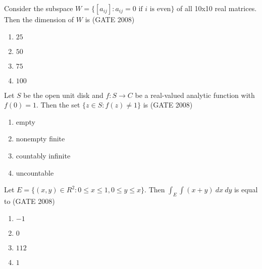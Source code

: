 \iffalse
\chapter{2008}
\author{AI24BTECH11030}
\section{ma}
\fi
    

\item {Consider the subspace $W=\{[a_{ij}]: a_{ij}=0 \text{ if } i \text{ is even}\}$ of all 10x10 real matrices. Then the dimension of $W$ is \hfill (GATE 2008)

\begin{multicols}{4}
    \begin{enumerate}
        \item $25$
        \item $50$
        \item $75$
        \item $100$
    \end{enumerate}
\end{multicols}}

\item { Let $S$ be the open unit disk and $f: S\rightarrow C$ be a real-valued analytic function with $f(0) = 1$. Then the set $\{z \in S: f(z) \ne 1\}$ is \hfill (GATE 2008)

\begin{multicols}{2}
    \begin{enumerate}
        \item{empty}
        \item{nonempty finite }
        \item{countably infinite}
        \item{uncountable}
    \end{enumerate}
\end{multicols}
}

\item{ Let $E=\{(x,y)\in R^2:0\leq x\leq1,0\leq y\leq x\}$. Then $\int_E\int(x+y) \: dx \: dy$ is equal to \hfill (GATE 2008)
\begin{multicols}{4}
\begin{enumerate}
    \item $-1$
    \item $0$
    \item $112$
    \item $1$
\end{enumerate}
\end{multicols}
}

